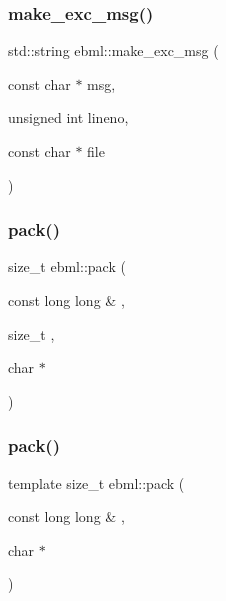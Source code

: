 \mbox{\label{namespaceebml_a41bf8a299c4418f406beff89817b0690}} 
\subsubsection{\texorpdfstring{make\+\_\+exc\+\_\+msg()}{make\_exc\_msg()}}
{\footnotesize\ttfamily std\+::string ebml\+::make\+\_\+exc\+\_\+msg (\begin{DoxyParamCaption}\item[{const char $\ast$}]{msg,  }\item[{unsigned int}]{lineno,  }\item[{const char $\ast$}]{file }\end{DoxyParamCaption})}

\mbox{\label{namespaceebml_ae32979c8cc295384d62cd00e9a256059}} 
\subsubsection{\texorpdfstring{pack()}{pack()}\hspace{0.1cm}{\footnotesize\ttfamily [1/24]}}
{\footnotesize\ttfamily size\+\_\+t ebml\+::pack (\begin{DoxyParamCaption}\item[{const long long \&}]{,  }\item[{size\+\_\+t}]{,  }\item[{char $\ast$}]{ }\end{DoxyParamCaption})}

\mbox{\label{namespaceebml_ac35ff5c48449c99a03dced64fdad8d9e}} 
\subsubsection{\texorpdfstring{pack()}{pack()}\hspace{0.1cm}{\footnotesize\ttfamily [2/24]}}
{\footnotesize\ttfamily template size\+\_\+t ebml\+::pack (\begin{DoxyParamCaption}\item[{const long long \&}]{,  }\item[{char $\ast$}]{ }\end{DoxyParamCaption})}

